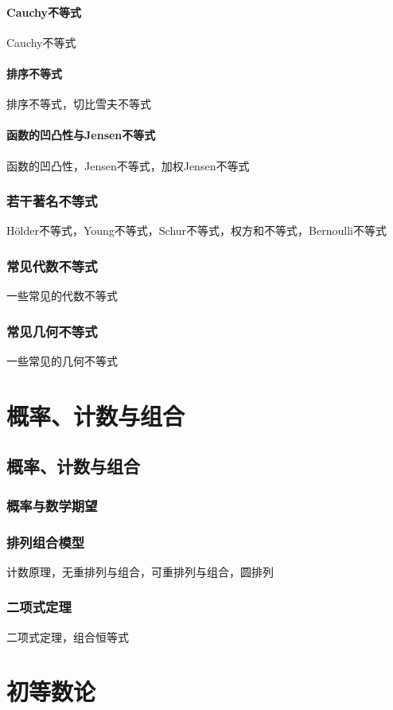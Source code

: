 \documentclass[lang=cn, zihao=5]{elegantbook}
\begin{document}
\subsection{Cauchy不等式}

Cauchy不等式

\subsection{排序不等式}

排序不等式，切比雪夫不等式

\subsection{函数的凹凸性与Jensen不等式}

函数的凹凸性，Jensen不等式，加权Jensen不等式

\section{若干著名不等式}

Hölder不等式，Young不等式，Schur不等式，权方和不等式，Bernoulli不等式

\section{常见代数不等式}

一些常见的代数不等式

\section{常见几何不等式}

一些常见的几何不等式

\part{概率、计数与组合}

\chapter{概率、计数与组合}

\section{概率与数学期望}

\section{排列组合模型}

计数原理，无重排列与组合，可重排列与组合，圆排列

\section{二项式定理}

二项式定理，组合恒等式

\part{初等数论}
\end{document}
